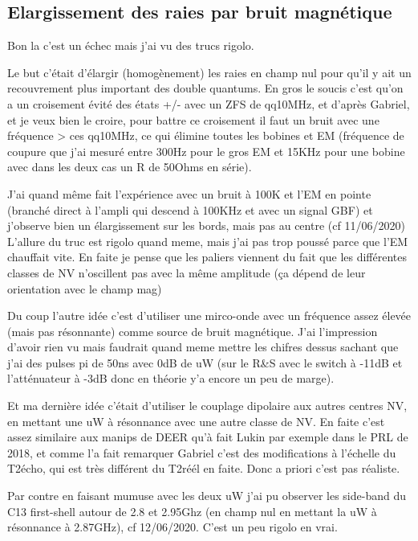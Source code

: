 \documentclass[a4paper]{report}
\begin{document}
 \subsection{Elargissement des raies par bruit magnétique}
 Bon la c'est un échec mais j'ai vu des trucs rigolo.
 
 Le but c'était d'élargir (homogènement) les raies en champ nul pour qu'il y ait un recouvrement plus important des double quantums. En gros le soucis c'est qu'on a un croisement évité des états +/- avec un ZFS de qq10MHz, et d'après Gabriel, et je veux bien le croire, pour battre ce croisement il faut un bruit avec une fréquence > ces qq10MHz, ce qui élimine toutes les bobines et EM (fréquence de coupure que j'ai mesuré entre 300Hz pour le gros EM et 15KHz pour une bobine avec dans les deux cas un R de 50Ohms en série). 
 
 J'ai quand même fait l'expérience avec un bruit à 100K et l'EM en pointe (branché direct à l'ampli qui descend à 100KHz et avec un signal GBF) et j'observe bien un élargissement sur les bords, mais pas au centre (cf 11/06/2020) L'allure du truc est rigolo quand meme, mais j'ai pas trop poussé parce que l'EM chauffait vite. En faite je pense que les paliers viennent du fait que les différentes classes de NV n'oscillent pas avec la même amplitude (ça dépend de leur orientation avec le champ mag)
 
 Du coup l'autre idée c'est d'utiliser une mirco-onde avec un fréquence assez élevée (mais pas résonnante) comme source de bruit magnétique. J'ai l'impression d'avoir rien vu mais faudrait quand meme mettre les chifres dessus sachant que j'ai des pulses pi de 50ns avec 0dB de uW (sur le R\&S avec le switch à -11dB et l'atténuateur à -3dB donc en théorie y'a encore un peu de marge).
 
 Et ma dernière idée c'était d'utiliser le couplage dipolaire aux autres centres NV, en mettant une uW à résonnance avec une autre classe de NV. En faite c'est assez similaire aux manips de DEER qu'à fait Lukin par exemple dans le PRL de 2018, et comme l'a fait remarquer Gabriel c'est des modifications à l'échelle du T2écho, qui est très différent du T2réél en faite. Donc a priori c'est pas réaliste.
 
 Par contre en faisant mumuse avec les deux uW j'ai pu observer les side-band du C13 first-shell autour de 2.8 et 2.95Ghz (en champ nul en mettant la uW à résonnance à 2.87GHz), cf 12/06/2020. C'est un peu rigolo en vrai.
  
\end{document}
